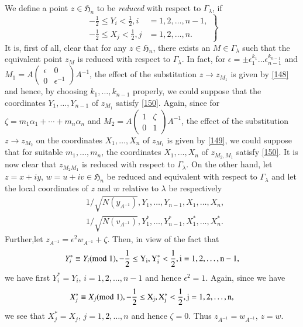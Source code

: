 We define a point $z\in\mathfrak{H}_{n}$ to be {\em reduced} with
respect to $\Gamma_{\lambda}$, if
\begin{equation*}
\left.
\begin{aligned}
-\frac{1}{2}\leq Y_{i}<\frac{1}{2}, i &= 1,2,\ldots,n-1,\\
-\frac{1}{2}\leq X_{j}<\frac{1}{2}, j &= 1,2,\ldots,n.
\end{aligned}
\right\}\tag{150}\label{150}
\end{equation*}
It is, first of all, clear that for any $z\in\mathfrak{H}_{n}$, there
exists an $M\in\Gamma_{\lambda}$ such that the equivalent point
$z_{M}$ is reduced with respect to $\Gamma_{\lambda}$. In fact, for
$\epsilon=\pm \epsilon^{k_{1}}_{1}\ldots\epsilon^{k_{n-1}}_{n-1}$ and
$M_{1}=A\left(\begin{smallmatrix} \epsilon & 0\\ 0 &\epsilon^{-1}
\end{smallmatrix}\right)A^{-1}$, the effect of the substitution $z\to
z_{M_{1}}$ is given by \eqref{148} and hence, by choosing
$k_{1},\ldots,k_{n-1}$ properly, we could suppose that the coordinates
$Y_{1},\ldots,Y_{n-1}$ of $z_{M_{1}}$ satisfy \eqref{150}. Again,
since for $\zeta=m_{1}\alpha_{1}+\cdots+m_{n}\alpha_{n}$ and
$M_{2}=A\left(\begin{smallmatrix} 1 & \zeta\\ 0 & 1
\end{smallmatrix}\right)A^{-1}$, the effect of the substitution $z\to
z_{M_{2}}$ on the coordinates $X_{1},\ldots,X_{n}$ of $z_{M_{1}}$ is
given by \eqref{149}, we could suppose that for suitable
$m_{1},\ldots,m_{n}$, the coordinates $X_{1},\ldots,X_{n}$ of
$z_{M_{2},M_{1}}$ satisfy \eqref{150}. It is now clear that
$z_{M_{2}M_{1}}$ is reduced with respect to $\Gamma_{\lambda}$. On the
other hand, let $z=x+iy$, $w=u+iv\in\mathfrak{H}_{n}$ be reduced and
equivalent with respect to $\Gamma_{\lambda}$ and let the local
coordinates of $z$ and $w$ relative to $\lambda$ be respectively
\begin{align*}
& 1/\sqrt{N(y_{A^{-1}})}, Y_{1},\ldots,Y_{n-1},X_{1},\ldots,X_{n},\\
&
  1/\sqrt{N(v_{A^{-1}})},Y^{\ast}_{1},\ldots,Y^{\ast}_{n-1},X^{\ast}_{1},\ldots,X^{\ast}_{n}. 
\end{align*}
Further,\pageoriginale let
$z_{A^{-1}}=\epsilon^{2}w_{A^{-1}}+\zeta$. Then, in view of the fact
that
$$
Y^{\ast}_{i}\equiv Y_{i}(\rm{mod} \;  1), -\frac{1}{2}\leq
Y_{i},Y^{\ast}_{i}<\frac{1}{2},i=1,2,\ldots,n-1, 
$$
we have first $Y^{\ast}_{i}=Y_{i}$, $i=1,2,\ldots,n-1$ and hence
$\epsilon^{2}=1$. Again, since we have
$$
X^{\ast}_{j}\equiv X_{j}(\rm{mod} \;  1),-\frac{1}{2}\leq
X_{j},X^{\ast}_{j}<\frac{1}{2},j=1,2,\ldots,n,
$$
we see that $X^{\ast}_{j}=X_{j}$, $j=1,2,\ldots,n$ and hence
$\zeta=0$. Thus $z_{A^{-1}}=w_{A^{-1}}$, \ie $z=w$.

